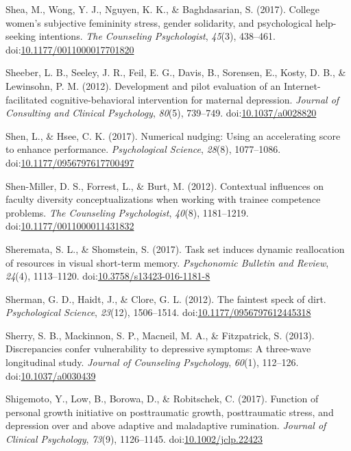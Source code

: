 \documentclass[english,man]{apa6}
\theoremstyle{definition}
\theoremstyle{definition}
\theoremstyle{definition}
\theoremstyle{remark}
\begin{document}
\hypertarget{ref-Shea2017}{}
Shea, M., Wong, Y. J., Nguyen, K. K., \& Baghdasarian, S. (2017).
College women's subjective femininity stress, gender solidarity, and
psychological help-seeking intentions. \emph{The Counseling
Psychologist}, \emph{45}(3), 438--461.
doi:\href{https://doi.org/10.1177/0011000017701820}{10.1177/0011000017701820}

\hypertarget{ref-Sheeber2012}{}
Sheeber, L. B., Seeley, J. R., Feil, E. G., Davis, B., Sorensen, E.,
Kosty, D. B., \& Lewinsohn, P. M. (2012). Development and pilot
evaluation of an Internet-facilitated cognitive-behavioral intervention
for maternal depression. \emph{Journal of Consulting and Clinical
Psychology}, \emph{80}(5), 739--749.
doi:\href{https://doi.org/10.1037/a0028820}{10.1037/a0028820}

\hypertarget{ref-Shen2017}{}
Shen, L., \& Hsee, C. K. (2017). Numerical nudging: Using an
accelerating score to enhance performance. \emph{Psychological Science},
\emph{28}(8), 1077--1086.
doi:\href{https://doi.org/10.1177/0956797617700497}{10.1177/0956797617700497}

\hypertarget{ref-Shen-Miller2012}{}
Shen-Miller, D. S., Forrest, L., \& Burt, M. (2012). Contextual
influences on faculty diversity conceptualizations when working with
trainee competence problems. \emph{The Counseling Psychologist},
\emph{40}(8), 1181--1219.
doi:\href{https://doi.org/10.1177/0011000011431832}{10.1177/0011000011431832}

\hypertarget{ref-Sheremata2016}{}
Sheremata, S. L., \& Shomstein, S. (2017). Task set induces dynamic
reallocation of resources in visual short-term memory. \emph{Psychonomic
Bulletin and Review}, \emph{24}(4), 1113--1120.
doi:\href{https://doi.org/10.3758/s13423-016-1181-8}{10.3758/s13423-016-1181-8}

\hypertarget{ref-Sherman2012}{}
Sherman, G. D., Haidt, J., \& Clore, G. L. (2012). The faintest speck of
dirt. \emph{Psychological Science}, \emph{23}(12), 1506--1514.
doi:\href{https://doi.org/10.1177/0956797612445318}{10.1177/0956797612445318}

\hypertarget{ref-Sherry2013}{}
Sherry, S. B., Mackinnon, S. P., Macneil, M. A., \& Fitzpatrick, S.
(2013). Discrepancies confer vulnerability to depressive symptoms: A
three-wave longitudinal study. \emph{Journal of Counseling Psychology},
\emph{60}(1), 112--126.
doi:\href{https://doi.org/10.1037/a0030439}{10.1037/a0030439}

\hypertarget{ref-Shigemoto2017}{}
Shigemoto, Y., Low, B., Borowa, D., \& Robitschek, C. (2017). Function
of personal growth initiative on posttraumatic growth, posttraumatic
stress, and depression over and above adaptive and maladaptive
rumination. \emph{Journal of Clinical Psychology}, \emph{73}(9),
1126--1145.
doi:\href{https://doi.org/10.1002/jclp.22423}{10.1002/jclp.22423}
\end{document}
